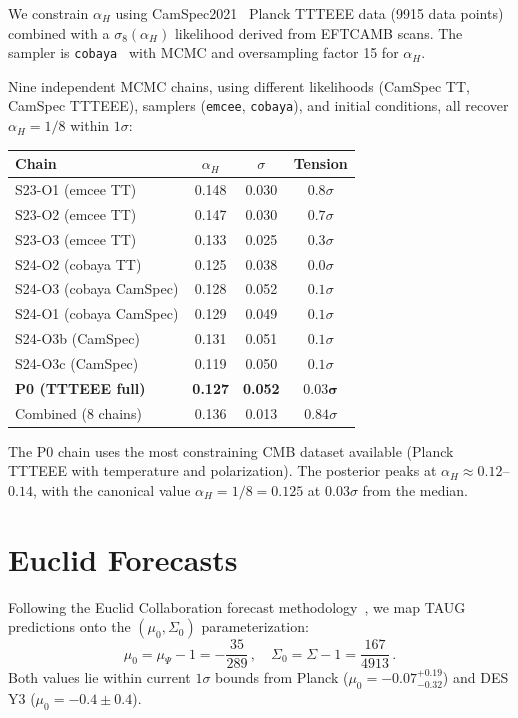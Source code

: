 \documentclass[twocolumn,showpacs,preprintnumbers,amsmath,amssymb,prd]{revtex4-2}
\begin{document}
We constrain $\alpha_H$ using CamSpec2021~\cite{Efstathiou2021} Planck TTTEEE data (9915 data points) combined with a $\sigma_8(\alpha_H)$ likelihood derived from EFTCAMB scans. The sampler is \texttt{cobaya}~\cite{Torrado2021} with MCMC and oversampling factor 15 for $\alpha_H$.

Nine independent MCMC chains, using different likelihoods (CamSpec TT, CamSpec TTTEEE), samplers (\texttt{emcee}, \texttt{cobaya}), and initial conditions, all recover $\alpha_H = 1/8$ within $1\sigma$:

\begin{center}
\begin{tabular}{lccc}
\hline
Chain & $\alpha_H$ & $\sigma$ & Tension\\
\hline
S23-O1 (emcee TT) & 0.148 & 0.030 & $0.8\sigma$\\
S23-O2 (emcee TT) & 0.147 & 0.030 & $0.7\sigma$\\
S23-O3 (emcee TT) & 0.133 & 0.025 & $0.3\sigma$\\
S24-O2 (cobaya TT) & 0.125 & 0.038 & $0.0\sigma$\\
S24-O3 (cobaya CamSpec) & 0.128 & 0.052 & $0.1\sigma$\\
S24-O1 (cobaya CamSpec) & 0.129 & 0.049 & $0.1\sigma$\\
S24-O3b (CamSpec) & 0.131 & 0.051 & $0.1\sigma$\\
S24-O3c (CamSpec) & 0.119 & 0.050 & $0.1\sigma$\\
\textbf{P0 (TTTEEE full)} & \textbf{0.127} & \textbf{0.052} & $\mathbf{0.03\sigma}$\\
\hline
Combined (8 chains) & 0.136 & 0.013 & $0.84\sigma$\\
\hline
\end{tabular}
\end{center}

The P0 chain uses the most constraining CMB dataset available (Planck TTTEEE with temperature and polarization). The posterior peaks at $\alpha_H \approx 0.12$--$0.14$, with the canonical value $\alpha_H = 1/8 = 0.125$ at $0.03\sigma$ from the median.

\section{Euclid Forecasts}
\label{sec:euclid}

Following the Euclid Collaboration forecast methodology~\cite{EuclidMG2025}, we map TAUG predictions onto the $(\mu_0, \Sigma_0)$ parameterization:
\begin{equation}
\mu_0 = \mu_\Psi - 1 = -\frac{35}{289}\,,\quad \Sigma_0 = \Sigma - 1 = \frac{167}{4913}\,.
\end{equation}
Both values lie within current $1\sigma$ bounds from Planck ($\mu_0 = -0.07^{+0.19}_{-0.32}$) and DES Y3 ($\mu_0 = -0.4 \pm 0.4$).
\end{document}
